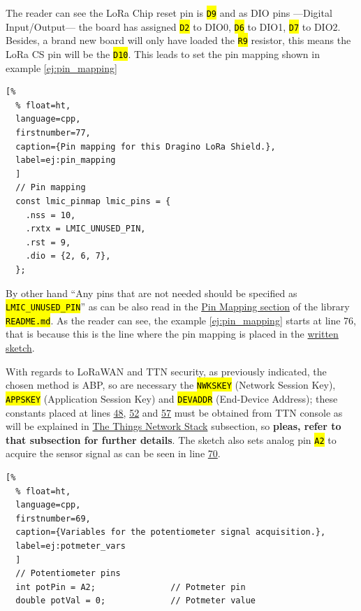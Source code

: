 \documentclass[11pt,a4paper,dvipsnames,twoside]{article}
\newcommand{\cmd}[1] {\hl{\texttt{#1}}}
\begin{document}
The reader can see the LoRa Chip reset pin is \cmd{D9} and as DIO pins ---Digital Input/Output--- the board has assigned \cmd{D2} to DIO0, \cmd{D6} to DIO1, \cmd{D7} to DIO2. Besides, a brand new board will only have loaded the \cmd{R9} resistor, this means the LoRa CS pin will be the \cmd{D10}. This leads to set the pin mapping shown in example \ref{ej:pin_mapping}

\begin{lstlisting}[%
  % float=ht,
  language=cpp,
  firstnumber=77,
  caption={Pin mapping for this Dragino LoRa Shield.},
  label=ej:pin_mapping
  ]
  // Pin mapping
  const lmic_pinmap lmic_pins = {
    .nss = 10,
    .rxtx = LMIC_UNUSED_PIN,
    .rst = 9,
    .dio = {2, 6, 7},
  };
\end{lstlisting}

By other hand \enquote{Any pins that are not needed should be specified as \cmd{LMIC\_UNUSED\_PIN}} as can be also read in the \href{https://github.com/mcci-catena/arduino-lmic#pin-mapping}{Pin Mapping section} of the library \cmd{README.md}. As the reader can see, the example \ref{ej:pin_mapping} starts at line 76, that is because this is the line where the pin mapping is placed in the \href{https://github.com/WyRe/lora-arduino-dendrometer/blob/master/src/arduino/dendro/dendro.ino#L76}{written sketch}.

With regards to LoRaWAN and TTN security, as previously indicated, the chosen method is ABP, so are necessary the \cmd{NWKSKEY} (Network Session Key), \cmd{APPSKEY} (Application Session Key) and \cmd{DEVADDR} (End-Device Address); these constants placed at lines \href{https://github.com/WyRe/lora-arduino-dendrometer/blob/master/src/arduino/dendro/dendro.ino#L48}{48}, \href{https://github.com/WyRe/lora-arduino-dendrometer/blob/master/src/arduino/dendro/dendro.ino#L52}{52} and \href{https://github.com/WyRe/lora-arduino-dendrometer/blob/master/src/arduino/dendro/dendro.ino#L57}{57} must be obtained from TTN console as will be explained in \hyperref[sssec:TTN_Stack]{The Things Network Stack} subsection, so \textbf{pleas, refer to that subsection for further details}. The sketch also sets analog pin \cmd{A2} to acquire the sensor signal as can be seen in line \href{https://github.com/WyRe/lora-arduino-dendrometer/blob/master/src/arduino/dendro/dendro.ino#L70}{70}.%

\begin{lstlisting}[%
  % float=ht,
  language=cpp,
  firstnumber=69,
  caption={Variables for the potentiometer signal acquisition.},
  label=ej:potmeter_vars
  ]
  // Potentiometer pins
  int potPin = A2;               // Potmeter pin
  double potVal = 0;             // Potmeter value
\end{lstlisting}
\end{document}
